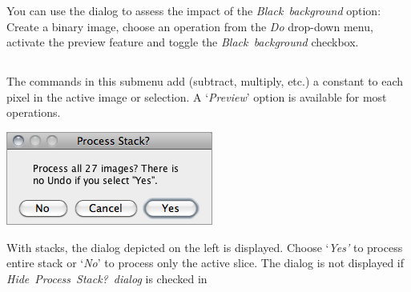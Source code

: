 \begin{infobox}
\begin{minipage}[c][1\totalheight][t]{0.66\columnwidth}
\medskip{}
You can use the 
dialog to assess the impact of the \emph{Black\ background} option:
Create a binary image, choose an operation from the \emph{Do} drop-down
menu, activate the preview feature and toggle the \emph{Black\ background}
checkbox.


%
\end{minipage} 
\end{infobox}



\subsection{\protect{}\label{sub:Math}}

The commands in this submenu add (subtract, multiply,
etc.) a constant to each pixel in the active image or selection. A
`\emph{Preview}' option is available for most operations.\medskip{}


\begin{minipage}[c][1\totalheight][t]{0.37\columnwidth}%
\includegraphics[scale=0.55]{images/ProcessStack}%
\end{minipage}%
\begin{minipage}[c][1\totalheight][t]{0.63\columnwidth}%
With stacks, the dialog depicted on the left is displayed. Choose
`\emph{Yes'} to process entire stack or `\emph{No}' to process
only the active slice. The dialog is not displayed if \emph{Hide}\ \emph{\textquotedbl{}Process}\ \emph{Stack?\textquotedbl{}}\ \emph{dialog
}is checked in %
\end{minipage}




\subsubsection{\protect{}}

